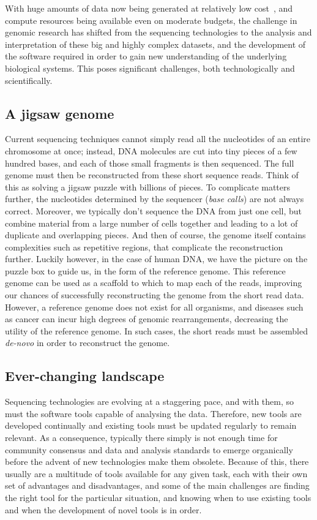\begin{justify}
With huge amounts of data now being generated at relatively low cost~\cite{chen2014big}, and compute resources being available even on moderate budgets, the challenge in genomic research has shifted from the sequencing technologies to the analysis and interpretation of these big and highly complex datasets, and the development of the software required in order to gain new understanding of the underlying biological systems. This poses significant challenges, both technologically and scientifically.


\subsection{A jigsaw genome}
Current sequencing techniques cannot simply read all the nucleotides of an entire chromosome at once; instead, DNA molecules are cut into tiny pieces of a few hundred bases, and each of those small fragments is then sequenced. The full genome must then be reconstructed from these short sequence reads. Think of this as solving a jigsaw puzzle with billions of pieces. To complicate matters further, the nucleotides determined by the sequencer (\emph{base calls}) are not always correct. Moreover, we typically don't sequence the DNA from just one cell, but combine material from a large number of cells together and leading to a lot of duplicate and overlapping pieces. And then of course, the genome itself contains complexities such as repetitive regions, that complicate the reconstruction further. Luckily however, in the case of human DNA, we have the picture on the puzzle box to guide us, in the form of the reference genome. This reference genome can be used as a scaffold to which to map each of the reads, improving our chances of successfully reconstructing the genome from the short read data. However, a reference genome does not exist for all organisms, and diseases such as cancer can incur high degrees of genomic rearrangements, decreasing the utility of the reference genome. In such cases, the short reads must be assembled \emph{de-novo} in order to reconstruct the genome.

\subsection{Ever-changing landscape}
Sequencing technologies are evolving at a staggering pace, and with them, so must the software tools capable of analysing the data. Therefore, new tools are developed continually and existing tools must be updated regularly to remain relevant. As a consequence, typically there simply is not enough time for community consensus and data and analysis standards to emerge organically before the advent of new technologies make them obsolete. Because of this, there usually are a multitude of tools available for any given task, each with their own set of advantages and disadvantages, and some of the main challenges are finding the right tool for the particular situation, and knowing when to use existing tools and when the development of novel tools is in order.



\end{justify}
